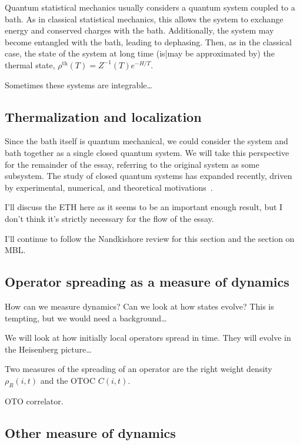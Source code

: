 \documentclass[a4paper,12pt]{article}
\begin{document}
Quantum statistical mechanics usually considers a quantum system coupled to a bath. As in classical statistical mechanics, this allows the system to exchange energy and conserved charges with the bath. Additionally, the system may become entangled with the bath, leading to dephasing. Then, as in the classical case, the state of the system at long time (is|may be approximated by) the thermal state, $\rho^{\text{th}}(T)=Z^{-1}(T)e^{-H/T}$. 

Sometimes these systems are integrable\dots

\subsection{Thermalization and localization} \label{sub:therm}

Since the bath itself is quantum mechanical, we could consider the system and bath together as a single closed quantum system. We will take this perspective for the remainder of the essay, referring to the original system as some subsystem. The study of closed quantum systems has expanded recently, driven by experimental, numerical, and theoretical motivations~\cite{GogolinStatMech}.

I'll discuss the ETH here as it seems to be an important enough result, but I don't think it's strictly necessary for the flow of the essay.

I'll continue to follow the Nandkishore review for this section and the section on MBL.

\subsection{Operator spreading as a measure of dynamics} \label{sub:opsp}

How can we measure dynamics?
Can we look at how states evolve?
This is tempting, but we would need a background\dots

We will look at how initially local operators spread in time. They will evolve in the Heisenberg picture\dots

Two measures of the spreading of an operator are the right weight density $\rho_R(i,t)$ and the OTOC $C(i,t)$.

OTO correlator.

\subsection{Other measure of dynamics} \label{sub:other}
\end{document}
